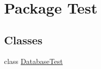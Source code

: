 \hypertarget{namespace_test}{}\section{Package Test}
\label{namespace_test}
\subsection*{Classes}
\begin{DoxyCompactItemize}
\item 
class \hyperlink{class_test_1_1_database_test}{Database\+Test}
\end{DoxyCompactItemize}
